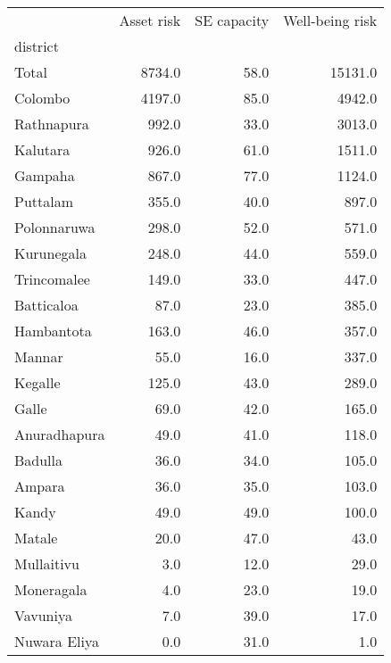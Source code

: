 \begin{tabular}{lrrr}
\toprule
{} &  Asset risk &  SE capacity &  Well-being risk \\
district     &             &              &                  \\
\midrule
Total        &      8734.0 &         58.0 &          15131.0 \\
Colombo      &      4197.0 &         85.0 &           4942.0 \\
Rathnapura   &       992.0 &         33.0 &           3013.0 \\
Kalutara     &       926.0 &         61.0 &           1511.0 \\
Gampaha      &       867.0 &         77.0 &           1124.0 \\
Puttalam     &       355.0 &         40.0 &            897.0 \\
Polonnaruwa  &       298.0 &         52.0 &            571.0 \\
Kurunegala   &       248.0 &         44.0 &            559.0 \\
Trincomalee  &       149.0 &         33.0 &            447.0 \\
Batticaloa   &        87.0 &         23.0 &            385.0 \\
Hambantota   &       163.0 &         46.0 &            357.0 \\
Mannar       &        55.0 &         16.0 &            337.0 \\
Kegalle      &       125.0 &         43.0 &            289.0 \\
Galle        &        69.0 &         42.0 &            165.0 \\
Anuradhapura &        49.0 &         41.0 &            118.0 \\
Badulla      &        36.0 &         34.0 &            105.0 \\
Ampara       &        36.0 &         35.0 &            103.0 \\
Kandy        &        49.0 &         49.0 &            100.0 \\
Matale       &        20.0 &         47.0 &             43.0 \\
Mullaitivu   &         3.0 &         12.0 &             29.0 \\
Moneragala   &         4.0 &         23.0 &             19.0 \\
Vavuniya     &         7.0 &         39.0 &             17.0 \\
Nuwara Eliya &         0.0 &         31.0 &              1.0 \\
\bottomrule
\end{tabular}
